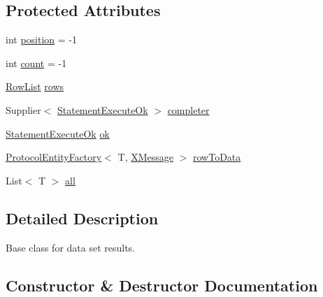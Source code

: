 \subsection*{Protected Attributes}
\begin{DoxyCompactItemize}
\item 
int \mbox{\hyperlink{classcom_1_1mysql_1_1cj_1_1xdevapi_1_1_abstract_data_result_aa3f163eb4a252399c9aa0bdb8e02ca9b}{position}} = -\/1
\item 
int \mbox{\hyperlink{classcom_1_1mysql_1_1cj_1_1xdevapi_1_1_abstract_data_result_ac8f7cdced67df259befd51e1e7d9a2b7}{count}} = -\/1
\item 
\mbox{\hyperlink{interfacecom_1_1mysql_1_1cj_1_1result_1_1_row_list}{Row\+List}} \mbox{\hyperlink{classcom_1_1mysql_1_1cj_1_1xdevapi_1_1_abstract_data_result_ae04b2bf0af10423f89abe996549946f9}{rows}}
\item 
Supplier$<$ \mbox{\hyperlink{classcom_1_1mysql_1_1cj_1_1protocol_1_1x_1_1_statement_execute_ok}{Statement\+Execute\+Ok}} $>$ \mbox{\hyperlink{classcom_1_1mysql_1_1cj_1_1xdevapi_1_1_abstract_data_result_aec36caa2d5404a5748add97ebab8bc1e}{completer}}
\item 
\mbox{\hyperlink{classcom_1_1mysql_1_1cj_1_1protocol_1_1x_1_1_statement_execute_ok}{Statement\+Execute\+Ok}} \mbox{\hyperlink{classcom_1_1mysql_1_1cj_1_1xdevapi_1_1_abstract_data_result_a685a1078d618fe85fa65e7511f512985}{ok}}
\item 
\mbox{\hyperlink{interfacecom_1_1mysql_1_1cj_1_1protocol_1_1_protocol_entity_factory}{Protocol\+Entity\+Factory}}$<$ T, \mbox{\hyperlink{classcom_1_1mysql_1_1cj_1_1protocol_1_1x_1_1_x_message}{X\+Message}} $>$ \mbox{\hyperlink{classcom_1_1mysql_1_1cj_1_1xdevapi_1_1_abstract_data_result_a05558a272c6983191c011faaf3de89ad}{row\+To\+Data}}
\item 
List$<$ T $>$ \mbox{\hyperlink{classcom_1_1mysql_1_1cj_1_1xdevapi_1_1_abstract_data_result_a77a21d804536b015015d39ad4b45a1c0}{all}}
\end{DoxyCompactItemize}


\subsection{Detailed Description}
Base class for data set results. 

\subsection{Constructor \& Destructor Documentation}
\mbox{\label{classcom_1_1mysql_1_1cj_1_1xdevapi_1_1_abstract_data_result_a662bf16eb25a6e01e053580bc63f020d}} 
